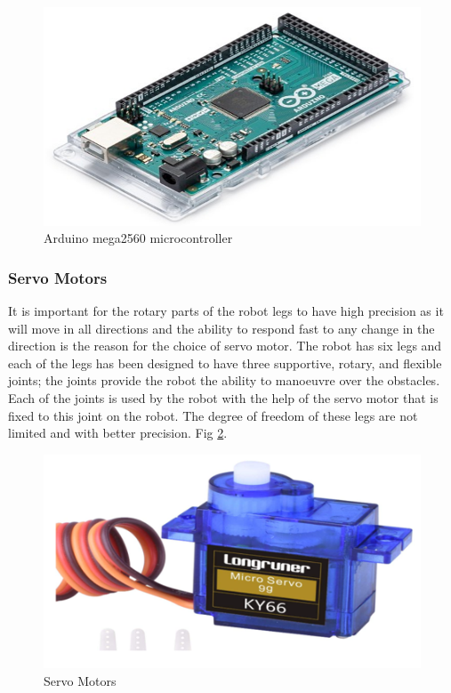 \documentclass[10pt,journal,compsoc]{IEEEtran}
\begin{document}
\begin{figure}[h]
\includegraphics[scale=0.51]{mega}
\caption{Arduino mega2560 microcontroller}
\label{fig:mega}
\end{figure}

\subsubsection{Servo Motors}

It is important for the rotary parts of the robot legs to have high precision as it will move in all directions and the ability to respond fast to any change in the direction is the reason for the choice of servo motor. The robot has six legs and each of the legs has been designed to have three supportive, rotary, and flexible joints; the joints provide the robot the ability to manoeuvre over the obstacles. Each of the joints is used by the robot with the help of the servo motor that is fixed to this joint on the robot. The degree of freedom of these legs are not limited and with better precision. \cite{robarm} Fig \ref{fig:servo}.

\begin{figure}[h]
\includegraphics[scale=0.72]{servo}
\caption{Servo Motors}
\label{fig:servo}
\end{figure}
\end{document}
